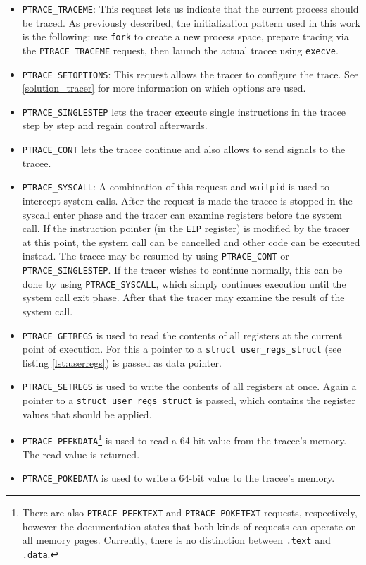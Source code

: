 \documentclass{article}
\begin{document}
\begin{itemize}
    \item \texttt{PTRACE\_TRACEME}: This request lets us indicate that the current process should be traced. As previously described, the initialization pattern used in this work is the following: use \texttt{fork} to create a new process space, prepare tracing via the \texttt{PTRACE\_TRACEME} request, then launch the actual tracee using \texttt{execve}.
    \item \texttt{PTRACE\_SETOPTIONS}: This request allows the tracer to configure the trace. See \ref{solution_tracer} for more information on which options are used.
    \item \texttt{PTRACE\_SINGLESTEP} lets the tracer execute single instructions in the tracee step by step and regain control afterwards.
    \item \texttt{PTRACE\_CONT} lets the tracee continue and also allows to send signals to the tracee.
    \item \texttt{PTRACE\_SYSCALL}: A combination of this request and \texttt{waitpid} is used to intercept system calls. After the request is made the tracee is stopped in the syscall enter phase and the tracer can examine registers before the system call. If the instruction pointer (in the \texttt{EIP} register) is modified by the tracer at this point, the system call can be cancelled and other code can be executed instead. The tracee may be resumed by using \texttt{PTRACE\_CONT} or \texttt{PTRACE\_SINGLESTEP}. If the tracer wishes to continue normally, this can be done by using \texttt{PTRACE\_SYSCALL}, which simply continues execution until the system call exit phase. After that the tracer may examine the result of the system call.
    \item \texttt{PTRACE\_GETREGS} is used to read the contents of all registers at the current point of execution. For this a pointer to a \texttt{struct user\_regs\_struct} (see listing \ref{lst:userregs}) is passed as data pointer.
    \item \texttt{PTRACE\_SETREGS} is used to write the contents of all registers at once. Again a pointer to a \texttt{struct user\_regs\_struct} is passed, which contains the register values that should be applied.
    \item \texttt{PTRACE\_PEEKDATA}\footnote{There are also \texttt{PTRACE\_PEEKTEXT} and \texttt{PTRACE\_POKETEXT} requests, respectively, however the documentation states that both kinds of requests can operate on all memory pages. Currently, there is no distinction between \texttt{.text} and \texttt{.data}.} is used to read a 64-bit value from the tracee's memory. The read value is returned.
    \item \texttt{PTRACE\_POKEDATA} is used to write a 64-bit value to the tracee's memory.
\end{itemize}
\end{document}
